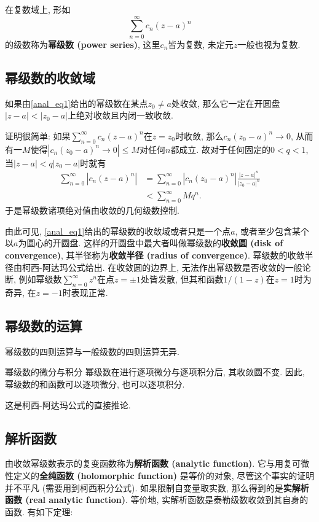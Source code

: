 
在复数域上, 形如
\begin{equation}\label{anal_eq1}
\sum_{n=0}^\infty c_n(z-a)^n
\end{equation}
的级数称为\textbf{幂级数 (power series)}, 这里$c_n$皆为复数, 未定元$z$一般也视为复数. 

\subsection{幂级数的收敛域}
\begin{theorem}{}
如果由\autoref{anal_eq1}给出的幂级数在某点$z_0\neq a$处收敛, 那么它一定在开圆盘$|z-a|<|z_0-a|$上绝对收敛且内闭一致收敛.
\end{theorem}

证明很简单: 如果$\sum_{n=0}^\infty c_n(z-a)^n$在$z=z_0$时收敛, 那么$c_n(z_0-a)^n\to0$, 从而有一$M$使得$|c_n(z_0-a)^n\to0|\leq M$对任何$n$都成立. 故对于任何固定的$0<q<1$, 当$|z-a|<q|z_0-a|$时就有
$$
\begin{aligned}
\sum_{n=0}^\infty |c_n(z-a)^n|
&=\sum_{n=0}^\infty |c_n(z_0-a)^n|\frac{|z-a|^n}{|z_0-a|^n}\\
&<\sum_{n=0}^\infty Mq^n.
\end{aligned}
$$
于是幂级数诸项绝对值由收敛的几何级数控制.

由此可见, \autoref{anal_eq1}给出的幂级数的收敛域或者只是一个点$a$, 或者至少包含某个以$a$为圆心的开圆盘. 这样的开圆盘中最大者叫做幂级数的\textbf{收敛圆 (disk of convergence)}, 其半径称为\textbf{收敛半径 (radius of convergence)}. 幂级数的收敛半径由柯西-阿达玛公式给出. 在收敛圆的边界上, 无法作出幂级数是否收敛的一般论断, 例如幂级数$\sum_{n=0}^\infty z^n$在点$z=\pm1$处皆发散, 但其和函数$1/(1-z)$在$z=1$时为奇异, 在$z=-1$时表现正常.

\subsection{幂级数的运算}
幂级数的四则运算与一般级数的四则运算无异.

\begin{theorem}{幂级数的微分与积分}
幂级数在进行逐项微分与逐项积分后, 其收敛圆不变. 因此, 幂级数的和函数可以逐项微分, 也可以逐项积分.
\end{theorem}
这是柯西-阿达玛公式的直接推论. 

\subsection{解析函数}
由收敛幂级数表示的复变函数称为\textbf{解析函数 (analytic function)}. 它与用复可微性定义的\textbf{全纯函数 (holomorphic function)} 是等价的对象, 尽管这个事实的证明并不平凡 (需要用到柯西积分公式). 如果限制自变量取实数, 那么得到的是\textbf{实解析函数 (real analytic function)}. 等价地, 实解析函数是泰勒级数收敛到其自身的函数. 有如下定理:

